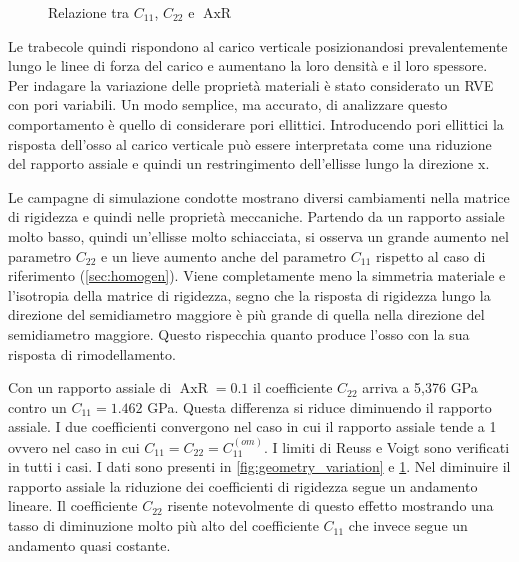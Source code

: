\documentclass[a4paper,num-refs]{oup-contemporary}
\begin{document}
\label{sec:variazione_simmetria}

\begin{figure}[bt!] %

	\centering
	\def\svgwidth{0.9\linewidth}
	
	\caption{Relazione tra $C_{11}$, $C_{22}$ e $\operatorname{AxR}$ }
	\label{fig:geometric_variation}
\end{figure}





Le trabecole quindi rispondono al carico verticale posizionandosi prevalentemente lungo le linee di forza del carico e aumentano la loro densità e il loro spessore. Per indagare la variazione delle proprietà materiali è stato considerato un RVE con pori variabili. Un modo semplice, ma accurato, di analizzare questo comportamento è quello di considerare pori ellittici. Introducendo pori ellittici la risposta dell'osso al carico verticale può essere interpretata come una riduzione del rapporto assiale e quindi un restringimento dell'ellisse lungo la direzione x. 

Le campagne di simulazione condotte mostrano diversi cambiamenti nella matrice di rigidezza e quindi nelle proprietà meccaniche. Partendo da un rapporto assiale molto basso, quindi un'ellisse molto schiacciata, si osserva un grande aumento nel parametro $C_{22}$ e un lieve aumento anche del parametro $C_{11}$ rispetto al caso di riferimento (\cref{sec:homogen}). Viene completamente meno la simmetria materiale e l'isotropia della matrice di rigidezza, segno che la risposta di rigidezza lungo la direzione del semidiametro maggiore è più grande di quella nella direzione del semidiametro maggiore. Questo rispecchia quanto produce l'osso con la sua risposta di rimodellamento. 

Con un rapporto assiale di $\operatorname{AxR}=0.1$ il coefficiente $C_{22}$ arriva a 5,376 GPa contro un $C_{11}=1.462$ GPa. Questa differenza si riduce diminuendo il rapporto assiale. I due coefficienti convergono nel caso in cui il rapporto assiale tende a 1 ovvero nel caso in cui $C_{11}=C_{22}=C_{11}^{(om)}$. I limiti di Reuss e Voigt sono verificati in tutti i casi. I dati sono presenti in \cref{fig:geometry_variation} e \cref{fig:geometric_variation}. Nel diminuire il rapporto assiale la riduzione dei coefficienti di rigidezza segue un andamento lineare. Il coefficiente $C_{22}$ risente notevolmente di questo effetto mostrando una tasso di diminuzione molto più alto del coefficiente $C_{11}$ che invece segue un andamento quasi costante. 
\end{document}
